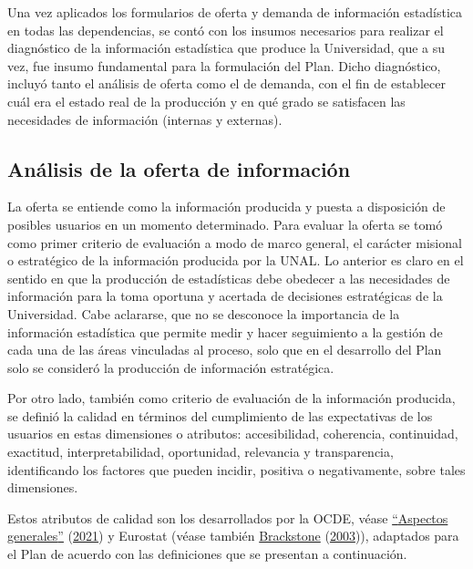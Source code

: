 \documentclass[
]{book}
\begin{document}
Una vez aplicados los formularios de oferta y demanda de información estadística en todas las
dependencias, se contó con los insumos necesarios para realizar el diagnóstico de la información
estadística que produce la Universidad, que a su vez, fue insumo fundamental para la formulación del
Plan. Dicho diagnóstico, incluyó tanto el análisis de oferta como el de demanda, con el fin de
establecer cuál era el estado real de la producción y en qué grado se satisfacen las necesidades de
información (internas y externas).

\hypertarget{anuxe1lisis-de-la-oferta-de-informaciuxf3n}{%
\subsection{Análisis de la oferta de información}\label{anuxe1lisis-de-la-oferta-de-informaciuxf3n}}

La oferta se entiende como la información producida y puesta a disposición de
posibles usuarios en un momento determinado. Para evaluar la oferta se tomó como primer
criterio de evaluación a modo de marco general, el carácter misional o estratégico de la
información producida por la UNAL. Lo anterior es claro en el sentido en que la producción de
estadísticas debe obedecer a las necesidades de información para la toma oportuna y acertada de
decisiones estratégicas de la Universidad. Cabe aclararse, que no se desconoce la importancia de la
información estadística que permite medir y hacer seguimiento a la gestión de cada una de las
áreas vinculadas al proceso, solo que en el desarrollo del Plan solo se consideró la producción de
información estratégica.

Por otro lado, también como criterio de evaluación de la información producida, se definió la
calidad en términos del cumplimiento de las expectativas de los usuarios en estas dimensiones o
atributos: accesibilidad, coherencia, continuidad, exactitud, interpretabilidad, oportunidad,
relevancia y transparencia, identificando los factores que pueden incidir, positiva o
negativamente, sobre tales dimensiones.

Estos atributos de calidad son los desarrollados por la OCDE, véase \protect\hyperlink{ref-BibEntry2021May}{{``{Aspectos generales}''}} (\protect\hyperlink{ref-BibEntry2021May}{2021}) y Eurostat (véase también \protect\hyperlink{ref-brackstone2003gestion}{Brackstone} (\protect\hyperlink{ref-brackstone2003gestion}{2003})), adaptados para el Plan de acuerdo con las definiciones que se presentan a continuación.
\end{document}
